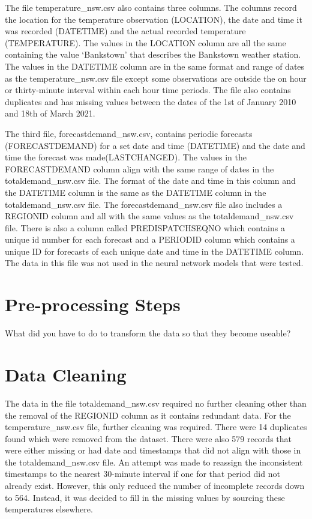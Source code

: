 \documentclass[mstat,12pt]{unswthesis}
\begin{document}
\bigskip

The file temperature\_nsw.csv also contains three columns. The columns
record the location for the temperature observation (LOCATION), the date
and time it was recorded (DATETIME) and the actual recorded temperature
(TEMPERATURE). The values in the LOCATION column are all the same
containing the value `Bankstown' that describes the Bankstown weather
station. The values in the DATETIME column are in the same format and
range of dates as the temperature\_nsw.csv file except some observations
are outside the on hour or thirty-minute interval within each hour time
periods. The file also contains duplicates and has missing values
between the dates of the 1st of January 2010 and 18th of March 2021.

\bigskip

The third file, forecastdemand\_nsw.csv, contains periodic forecasts
(FORECASTDEMAND) for a set date and time (DATETIME) and the date and
time the forecast was made(LASTCHANGED). The values in the
FORECASTDEMAND column align with the same range of dates in the
totaldemand\_nsw.csv file. The format of the date and time in this
column and the DATETIME column is the same as the DATETIME column in the
totaldemand\_nsw.csv file. The forecastdemand\_nsw.csv file also
includes a REGIONID column and all with the same values as the
totaldemand\_nsw.csv file. There is also a column called
PREDISPATCHSEQNO which contains a unique id number for each forecast and
a PERIODID column which contains a unique ID for forecasts of each
unique date and time in the DATETIME column. The data in this file was
not used in the neural network models that were tested.

\hypertarget{pre-processing-steps}{%
\section{Pre-processing Steps}\label{pre-processing-steps}}

What did you have to do to transform the data so that they become
useable?

\hypertarget{data-cleaning}{%
\section{Data Cleaning}\label{data-cleaning}}

The data in the file totaldemand\_nsw.csv required no further cleaning
other than the removal of the REGIONID column as it contains redundant
data. For the temperature\_nsw.csv file, further cleaning was required.
There were 14 duplicates found which were removed from the dataset.
There were also 579 records that were either missing or had date and
timestamps that did not align with those in the totaldemand\_nsw.csv
file. An attempt was made to reassign the inconsistent timestamps to the
nearest 30-minute interval if one for that period did not already exist.
However, this only reduced the number of incomplete records down to 564.
Instead, it was decided to fill in the missing values by sourcing these
temperatures elsewhere.
\end{document}

